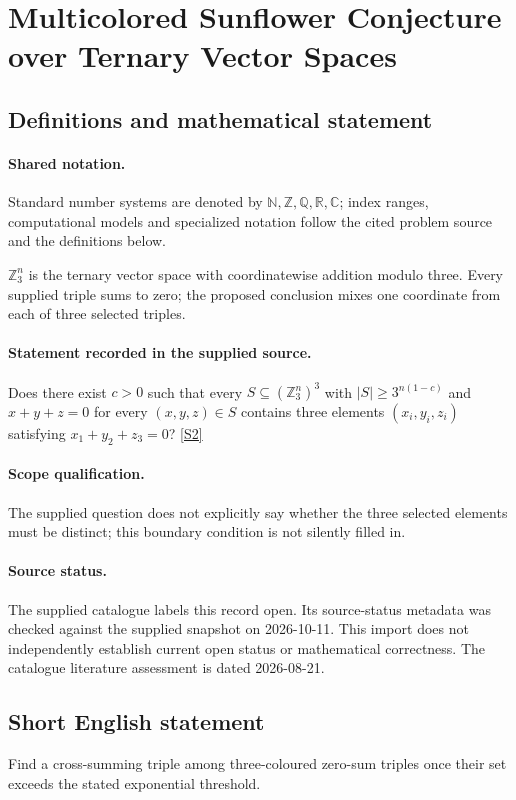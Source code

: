 \documentclass[11pt]{article}
\newcommand{\sref}[2]{\hyperlink{source:#1:#2}{[S#2]}}
\begin{document}
\section{Multicolored Sunflower Conjecture over Ternary Vector Spaces}\label{statement}

\subsection{Definitions and mathematical statement}

\paragraph{Shared notation.}Standard number systems are denoted by $\mathbb N,\mathbb Z,\mathbb Q,\mathbb R,\mathbb C$; index ranges, computational models and specialized notation follow the cited problem source and the definitions below.


$\mathbb Z_3^n$ is the ternary vector space with coordinatewise addition modulo three. Every supplied triple sums to zero; the proposed conclusion mixes one coordinate from each of three selected triples.
\paragraph{Statement recorded in the supplied source.}
Does there exist $c>0$ such that every $S\subseteq(\mathbb Z_3^n)^3$ with $|S|\geq3^{n(1-c)}$ and $x+y+z=0$ for every $(x,y,z)\in S$ contains three elements $(x_i,y_i,z_i)$ satisfying $x_1+y_2+z_3=0$? \sref{statement}{2}
\paragraph{Scope qualification.}
The supplied question does not explicitly say whether the three selected elements must be distinct; this boundary condition is not silently filled in.
\paragraph{Source status.}
The supplied catalogue labels this record open. Its source-status metadata was checked against the supplied snapshot on 2026-10-11. This import does not independently establish current open status or mathematical correctness. The catalogue literature assessment is dated 2026-08-21.
\subsection{Short English statement}
Find a cross-summing triple among three-coloured zero-sum triples once their set exceeds the stated exponential threshold.
\end{document}
